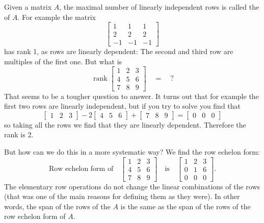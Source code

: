 Given a matrix $A$, the maximal number of linearly independent rows is called
the \emph{} of $A$.  For example the matrix
\begin{equation*}
\begin{bmatrix}
1 & 1 & 1 \\
2 & 2 & 2 \\
-1 & -1 & -1
\end{bmatrix}
\end{equation*}
has rank 1, as rows are linearly dependent:  The second and third
row are multiples of the first one.   But what is
\begin{equation*}
\operatorname{rank}
\begin{bmatrix}
1 & 2 & 3 \\
4 & 5 & 6 \\
7 & 8 & 9
\end{bmatrix} \quad = \quad ?
\end{equation*}
That seems to be a tougher question to answer.  It turns out that for
example the first two rows are linearly independent, but if you
try to solve you find that
\begin{equation*}
\begin{bmatrix}
1 & 2 & 3
\end{bmatrix} -2
\begin{bmatrix}
4 & 5 & 6 
\end{bmatrix} +
\begin{bmatrix}
7 & 8 & 9
\end{bmatrix} =
\begin{bmatrix}
0 & 0 & 0
\end{bmatrix}
\end{equation*}
so taking all the rows we find that they are linearly dependent.
Therefore the rank is 2.

But how can we do this in a more systematic way?  We find the row echelon
form:
\begin{equation*}
\text{Row echelon form of}
\quad
\begin{bmatrix}
1 & 2 & 3 \\
4 & 5 & 6  \\
7 & 8 & 9
\end{bmatrix}
\quad
\text{is}
\quad
\begin{bmatrix}
1 & 2 & 3 \\
0 & 1 & 6  \\
0 & 0 & 0
\end{bmatrix} .
\end{equation*}
The elementary row operations do not change the linear combinations of
the rows (that was one of the main reasons for defining them as they were).
In other words, the span of the rows of the $A$ is the same
as the span of the rows of the row echelon form of $A$.

